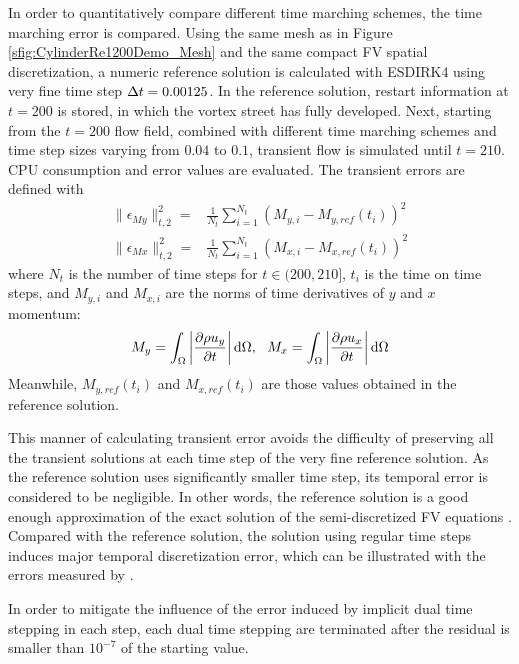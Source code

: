 In order to quantitatively compare different
time marching schemes,
the time marching error is compared.
Using the same mesh as in Figure \ref{sfig:CylinderRe1200Demo_Mesh}
and the same compact FV spatial  discretization,
a numeric reference solution is calculated with ESDIRK4 using
very fine time step ${\Delta} t = 0.00125$.
In the reference solution, restart information at $t=200$
is stored, in which the vortex street has fully developed.
Next, starting from the $t=200$ flow field, combined with
different time marching schemes and time step sizes
varying from $0.04$ to $0.1$, transient flow is simulated until $t=210$.
CPU consumption and error values are evaluated.
The transient errors are defined with
\begin{equation}
    \begin{aligned}
        \|\epsilon_{My}\|_{t,2}^2
        = & \frac{1}{N_{t}}\sum_{i=1}^{N_t}{(M_{y,i}-M_{y,ref}(t_i))^2} \\
        \|\epsilon_{Mx}\|_{t,2}^2
        = & \frac{1}{N_{t}}\sum_{i=1}^{N_t}{(M_{x,i}-M_{x,ref}(t_i))^2}
    \end{aligned}
    \label{eq:vorstreetErr}
\end{equation}
where $N_{t}$ is the number of time steps for $t\in(200,210]$,
$t_i$ is the time on time steps, and $M_{y,i}$ and $M_{x,i}$ are
the norms of time derivatives of $y$ and $x$ momentum:
\begin{equation}
    M_y = \int_{\Omega}{\left|\partialderivative{\rho u_y}{t}\right| \dd \Omega},\ \
    M_x = \int_{\Omega}{\left|\partialderivative{\rho u_x}{t}\right| \dd \Omega}
\end{equation}
Meanwhile, $M_{y,ref}(t_i)$ and $M_{x,ref}(t_i)$ are those values
obtained in the reference solution.

This manner of calculating transient error avoids the difficulty
of preserving all the transient solutions at each time step of
the very fine reference solution.
As the reference solution uses significantly smaller time step,
its temporal error is considered to be negligible.
In other words, the reference solution is a good enough
approximation of the exact solution of the semi-discretized
FV equations .
Compared with the reference
solution, the solution using regular time steps
induces major temporal discretization error, which can
be illustrated with the errors measured by .

In order to mitigate the influence of the error induced
by implicit dual time stepping in each step,
each dual time stepping are terminated after
the residual is smaller than $10^{-7}$ of the
starting value.

